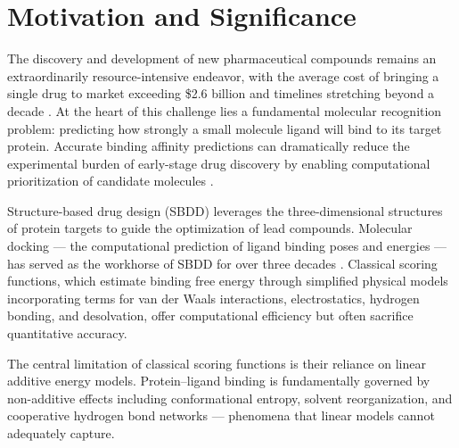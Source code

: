 \section{Motivation and Significance}

The discovery and development of new pharmaceutical compounds remains an extraordinarily resource-intensive endeavor, with the average cost of bringing a single drug to market exceeding \$2.6 billion and timelines stretching beyond a decade \cite{DiMasi2016}. At the heart of this challenge lies a fundamental molecular recognition problem: predicting how strongly a small molecule ligand will bind to its target protein. Accurate binding affinity predictions can dramatically reduce the experimental burden of early-stage drug discovery by enabling computational prioritization of candidate molecules \cite{Lyu2019}.

Structure-based drug design (SBDD) leverages the three-dimensional structures of protein targets to guide the optimization of lead compounds. Molecular docking --- the computational prediction of ligand binding poses and energies --- has served as the workhorse of SBDD for over three decades \cite{Kitchen2004}. Classical scoring functions, which estimate binding free energy through simplified physical models incorporating terms for van der Waals interactions, electrostatics, hydrogen bonding, and desolvation, offer computational efficiency but often sacrifice quantitative accuracy.

\begin{insightbox}
The central limitation of classical scoring functions is their reliance on linear additive energy models. Protein--ligand binding is fundamentally governed by non-additive effects including conformational entropy, solvent reorganization, and cooperative hydrogen bond networks --- phenomena that linear models cannot adequately capture.
\end{insightbox}
